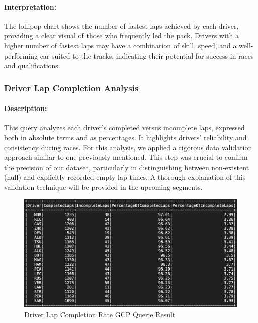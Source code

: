 \documentclass{article}
\begin{document}
\paragraph{Interpretation:}
The lollipop chart shows the number of fastest laps achieved by each driver, providing a clear visual of those who frequently led the pack. Drivers with a higher number of fastest laps may have a combination of skill, speed, and a well-performing car suited to the tracks, indicating their potential for success in races and qualifications.


\subsubsection{Driver Lap Completion Analysis}
\paragraph{Description:}
This query analyzes each driver's completed versus incomplete laps, expressed both in absolute terms and as percentages. It highlights drivers' reliability and consistency during races. For this analysis, we applied a rigorous data validation approach similar to one previously mentioned. This step was crucial to confirm the precision of our dataset, particularly in distinguishing between non-existent (null) and explicitly recorded empty lap times. A thorough explanation of this validation technique will be provided in the upcoming segments.

\begin{figure}[H]
    \centering
    \includegraphics[width=\textwidth]{complete-percentage.png}
    \caption{Driver Lap Completion Rate GCP Querie Result}
\end{figure}
\end{document}

